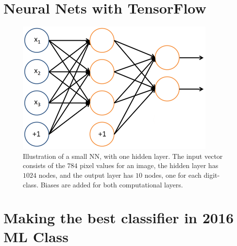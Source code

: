 \documentclass[a4paper,10pt,article,oneside,english]{memoir}
\begin{document}
\chapter{Neural Nets with TensorFlow}

\begin{figure}[h!]
	\centering
	\includegraphics[width=0.4\linewidth]{nn_layout.png}
	\caption{Illustration of a small NN, with one hidden layer. The input vector consists of the $784$ pixel values for an image, the hidden layer has $1024$ nodes, and the output layer has $10$ nodes, one for each digit-class. Biases are added for both computational layers.}
	\label{fig:nn_layout}
\end{figure}


\chapter{Making the best classifier in 2016 ML Class}



	
\end{document}
